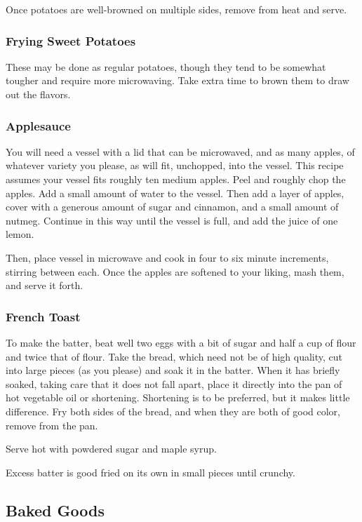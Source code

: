 \documentclass[10pt]{article}
\begin{document}
Once potatoes are well-browned on multiple sides, remove from heat and serve.

\subsubsection*{Frying Sweet Potatoes}

These may be done as regular potatoes, though they tend to be somewhat tougher and require more microwaving.
Take extra time to brown them to draw out the flavors.

\subsubsection*{Applesauce}

You will need a vessel with a lid that can be microwaved, and as many apples, of whatever variety you please, as will fit, unchopped, into the vessel.
This recipe assumes your vessel fits roughly ten medium apples.
Peel and roughly chop the apples.
Add a small amount of water to the vessel.
Then add a layer of apples, cover with a generous amount of sugar and cinnamon, and a small amount of nutmeg.
Continue in this way until the vessel is full, and add the juice of one lemon.

Then, place vessel in microwave and cook in four to six minute increments, stirring between each.
Once the apples are softened to your liking, mash them, and serve it forth.

\subsubsection*{French Toast}

To make the batter, beat well two eggs with a bit of sugar and half a cup of flour and twice that of flour.
Take the bread, which need not be of high quality, cut into large pieces (as you please) and soak it in the batter.
When it has briefly soaked, taking care that it does not fall apart, place it directly into the pan of hot vegetable oil or shortening.
Shortening is to be preferred, but it makes little difference.
Fry both sides of the bread, and when they are both of good color, remove from the pan.

Serve hot with powdered sugar and maple syrup.

Excess batter is good fried on its own in small pieces until crunchy.

\subsection*{Baked Goods}
\end{document}
